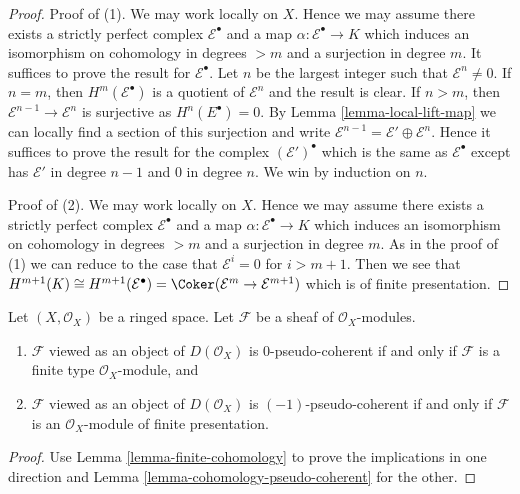 \begin{proof}
Proof of (1). We may work locally on $X$. Hence we may assume there exists
a strictly perfect complex $\mathcal{E}^\bullet$ and a map
$\alpha : \mathcal{E}^\bullet \to K$ which induces
an isomorphism on cohomology in degrees $> m$ and a surjection in degree $m$.
It suffices to prove the result for $\mathcal{E}^\bullet$.
Let $n$ be the largest integer such that $\mathcal{E}^n \not = 0$.
If $n = m$, then $H^m(\mathcal{E}^\bullet)$ is a quotient of
$\mathcal{E}^n$ and the result is clear.
If $n > m$, then $\mathcal{E}^{n - 1} \to \mathcal{E}^n$ is surjective as
$H^n(E^\bullet) = 0$. By Lemma \ref{lemma-local-lift-map}
we can locally find a section of this surjection and write
$\mathcal{E}^{n - 1} = \mathcal{E}' \oplus \mathcal{E}^n$.
Hence it suffices to prove the result for the complex
$(\mathcal{E}')^\bullet$ which is the same as $\mathcal{E}^\bullet$
except has $\mathcal{E}'$ in degree $n - 1$ and $0$ in degree $n$.
We win by induction on $n$.

\medskip\noindent
Proof of (2). We may work locally on $X$. Hence we may assume there exists
a strictly perfect complex $\mathcal{E}^\bullet$ and a map
$\alpha : \mathcal{E}^\bullet \to K$ which induces
an isomorphism on cohomology in degrees $> m$ and a surjection in degree $m$.
As in the proof of (1) we can reduce to the case that $\mathcal{E}^i = 0$
for $i > m + 1$. Then we see that
$H^{m + 1}(K) \cong H^{m + 1}(\mathcal{E}^\bullet) =
\Coker(\mathcal{E}^m \to \mathcal{E}^{m + 1})$
which is of finite presentation.
\end{proof}

\begin{lemma}
\label{lemma-n-pseudo-module}
Let $(X, \mathcal{O}_X)$ be a ringed space. Let $\mathcal{F}$ be a sheaf
of $\mathcal{O}_X$-modules.
\begin{enumerate}
\item $\mathcal{F}$ viewed as an object of $D(\mathcal{O}_X)$ is
$0$-pseudo-coherent if and only if $\mathcal{F}$ is a finite type
$\mathcal{O}_X$-module, and
\item $\mathcal{F}$ viewed as an object of $D(\mathcal{O}_X)$ is
$(-1)$-pseudo-coherent if and only if $\mathcal{F}$ is an
$\mathcal{O}_X$-module of finite presentation.
\end{enumerate}
\end{lemma}

\begin{proof}
Use Lemma \ref{lemma-finite-cohomology}
to prove the implications in one direction and
Lemma \ref{lemma-cohomology-pseudo-coherent} for the other.
\end{proof}





